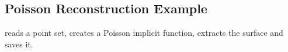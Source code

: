 \subsection{Poisson Reconstruction Example}

 reads a point set, creates a Poisson implicit function,
extracts the surface and saves it.



